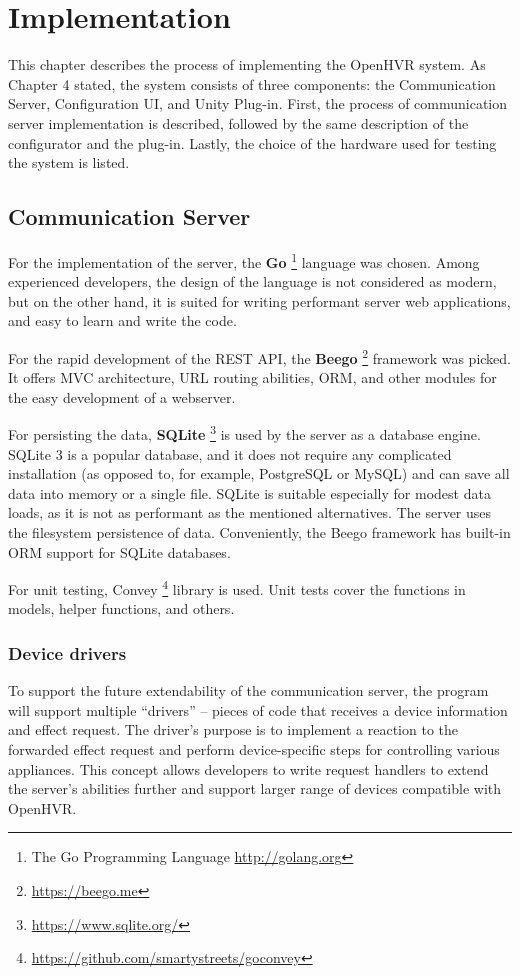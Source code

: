 \chapter{Implementation}

This chapter describes the process of implementing the OpenHVR system.
As Chapter 4 stated, the system consists of three components: the
Communication Server, Configuration UI, and Unity Plug-in. First, the process 
of communication server implementation is described,
followed by the same description of the configurator and the plug-in. 
Lastly, the choice of the hardware used for testing the system is listed.


\hypertarget{x-communication-server}{\section{Communication Server}}
For the implementation of the server, the
\textbf{Go} \footnote{The Go Programming Language \href{http://golang.org}{http://golang.org}} language was
chosen. Among experienced developers, the design of the language is not 
considered as modern, \cite{gogbu} but on the other hand, it is
suited for writing performant server web applications, and easy
to learn and write the code. 

For the rapid development of the REST API, the \textbf{Beego} \footnote{\href{https://beego.me}{https://beego.me}}
framework was picked. It offers MVC architecture, URL routing abilities, ORM,
and other modules for the easy development of a webserver.


For persisting the data, \textbf{SQLite} \footnote{\href{https://www.sqlite.org/}{https://www.sqlite.org/}}
is used by the server as a database engine. SQLite 3 is
a popular database, and it does not require any complicated installation
(as opposed to, for example, PostgreSQL or MySQL) and can save all data into
memory or a single file. SQLite is suitable especially for modest data loads, as
it is not as performant as the mentioned alternatives. The server uses the
filesystem persistence of data. Conveniently, the Beego framework has built-in
ORM support for SQLite databases.

For unit testing, Convey \footnote{\href{https://github.com/smartystreets/goconvey}{https://github.com/smartystreets/goconvey}}
library is used. Unit tests cover the functions in models, helper functions,
and others.

\subsection{Device drivers}
To support the future extendability of the communication server, the program
will support multiple ``drivers'' -- pieces of code that receives a device information 
and effect request. The driver's purpose is to implement a reaction to the 
forwarded effect request and perform device-specific steps for controlling
various appliances.
This concept allows developers to write request handlers to extend the server’s 
abilities further and support larger range of devices compatible with OpenHVR.

